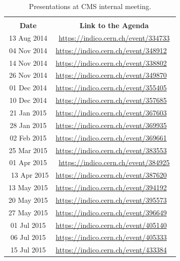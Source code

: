 \begin{table}[htb]
\centering
\caption{Presentations at CMS internal meeting.}
\label{meetings}
\begin{tabular}{cc} \hline
&\\[-0.2cm]
{\bf Date} & {\bf Link to the Agenda} \\[0.2cm]
\hline\hline
13 Aug 2014 & \href{https://indico.cern.ch/event/334733}{https://indico.cern.ch/event/334733} \\     
04 Nov 2014 &  \href{https://indico.cern.ch/event/348912}{https://indico.cern.ch/event/348912} \ \\
14 Nov 2014 & \href{https://indico.cern.ch/event/338802}{https://indico.cern.ch/event/338802} \ \\
26 Nov 2014 &  \href{https://indico.cern.ch/event/349870}{https://indico.cern.ch/event/349870} \ \\
01 Dec 2014 & \href{https://indico.cern.ch/event/355405}{https://indico.cern.ch/event/355405} \ \\
10 Dec 2014 &  \href{https://indico.cern.ch/event/357685}{https://indico.cern.ch/event/357685} \ \\
21 Jan 2015 &  \href{https://indico.cern.ch/event/367603}{https://indico.cern.ch/event/367603} \ \\
28 Jan 2015 &  \href{https://indico.cern.ch/event/369935}{https://indico.cern.ch/event/369935} \ \\
02 Feb 2015 & \href{https://indico.cern.ch/event/369661}{https://indico.cern.ch/event/369661} \ \\
25 Mar 2015 & \href{https://indico.cern.ch/event/383553}{https://indico.cern.ch/event/383553} \ \\
01 Apr 2015 & \href{https://indico.cern.ch/event/384925}{https://indico.cern.ch/event/384925} \\\
13 Apr 2015 & \href{https://indico.cern.ch/event/387620}{https://indico.cern.ch/event/387620} \ \\
13 May 2015 & \href{https://indico.cern.ch/event/394192}{https://indico.cern.ch/event/394192} \ \\
20 May 2015 & \href{https://indico.cern.ch/event/395573}{https://indico.cern.ch/event/395573} \ \\
27 May 2015 & \href{https://indico.cern.ch/event/396649}{https://indico.cern.ch/event/396649} \ \\
01 Jul 2015 & \href{https://indico.cern.ch/event/405140}{https://indico.cern.ch/event/405140} \ \\
06 Jul 2015 & \href{https://indico.cern.ch/event/405333}{https://indico.cern.ch/event/405333} \ \\
15 Jul 2015 & \href{https://indico.cern.ch/event/433384}{https://indico.cern.ch/event/433384} \ \\
\hline
\end{tabular}
\end{table}


